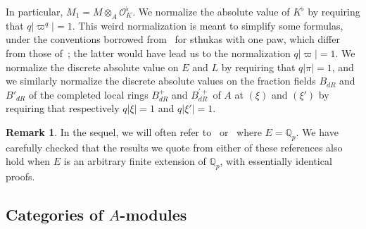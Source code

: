 \documentclass[11pt]{article}
\theoremstyle{definition}
\newtheorem{rema}[theo]{Remark}
\numberwithin{equation}{section}
\numberwithin{figure}{section}
\numberwithin{table}{section}
\newcommand*{\dR}{dR}
\begin{document}
In particular, $M_{1}=M\otimes_{A}\mathcal{O}_{K}^{\flat}$. We normalize the absolute value of $K^{\flat}$ by requiring that $q\left|\varpi^{q}\right|=1$. This weird normalization is meant to simplify some formulas, under the conventions borrowed from~\cite{BaMoSc16} for sthukas with one paw, which differ from those of~\cite{ScWe15}; the latter would have lead us to the normalization $q\left|\varpi\right|=1$. We normalize the discrete absolute value on $E$ and $L$ by requiring that $q\left|\pi\right|=1$, and we similarly normalize the discrete absolute values on the fraction fields $B_{\dR}$ and $B'_{\dR}$ of the completed local rings $B_{\dR}^{+}$ and $B_{\dR}^{\prime+}$ of $A$ at $(\xi)$ and $(\xi')$ by requiring that respectively $q\left|\xi\right|=1$ and $q\left|\xi'\right|=1$.
\begin{rema}
In the sequel, we will often refer to~\cite{BaMoSc16} or~\cite{ScWe15} where $E=\mathbb{Q}_{p}$. We have carefully checked that the results we quote from either of these references also hold when $E$ is an arbitrary finite extension of $\mathbb{Q}_{p}$, with essentially identical proofs.
\end{rema}

\subsection{Categories of \texorpdfstring{$A$}{A}-modules}

\subsubsection{}\label{subsec:ProjDimModA}
\end{document}
